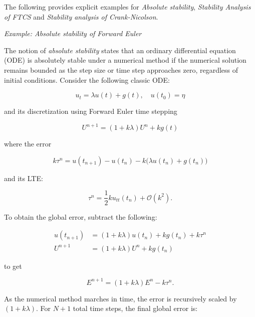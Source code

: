The following provides explicit examples for \textit{Absolute stability}, \textit{Stability Analysis of FTCS} and \textit{Stability analysis of Crank-Nicolson}. 

\vspace{0.5cm}
\begin{tcolorbox}[colback=yellow!5!white,colframe=yellow!75!black]
    \textit{Example: Absolute stability of Forward Euler}

    The notion of \textit{absolute stability} states that an ordinary differential equation (ODE) is absolutely stable under a numerical method if the numerical solution remains bounded as the step size or time step approaches zero, regardless of initial conditions. Consider the following classic ODE: 

    \begin{equation}
        u_t = \lambda u(t) + g(t), \quad u(t_0) = \eta
    \end{equation}

    and its discretization using Forward Euler time stepping

    \begin{equation}
        U^{n+1} = (1 + k\lambda) U^n + k g(t)
    \end{equation}

    where the error

    \begin{equation}
        k\tau^n = u(t_{n+1}) - u(t_n) - k\big(\lambda u(t_n) + g(t_n)\big)
    \end{equation}

    and its LTE:

    \begin{equation}
        \tau^n = \frac{1}{2} k u_{tt}(t_n) + \mathcal{O}(k^2). 
    \end{equation}

    To obtain the global error, subtract the following: 

    \begin{align}
        u(t_{n+1}) &= (1+k\lambda) u(t_n) + k g(t_n) + k \tau^n \\
        U^{n+1}   &= (1+k\lambda) U^{n}  + k g(t_n)
    \end{align}

    to get 

    \begin{equation}
        E^{n+1} = (1+k\lambda) E^n - k\tau^n. 
    \end{equation}

    As the numerical method marches in time, the error is recursively scaled by $(1+k\lambda)$. For $N+1$ total time steps, the final global error is: 


\end{tcolorbox}
